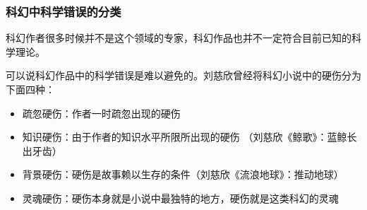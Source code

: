 \begin{frame}
  \frametitle{科幻中科学错误的分类}
  科幻作者很多时候并不是这个领域的专家，科幻作品也并不一定符合目前已知的科学理论。
  
  \pause
  
  可以说科幻作品中的科学错误是难以避免的。刘慈欣曾经将科幻小说中的硬伤分为下面四种：
  \begin{itemize}
    \item \alert{疏忽硬伤}：作者一时疏忽出现的硬伤
    \item \alert{知识硬伤}：由于作者的知识水平所限所出现的硬伤 （刘慈欣《鲸歌》：蓝鲸长出牙齿）
    \item \alert{背景硬伤}：硬伤是故事赖以生存的条件（刘慈欣《流浪地球》：推动地球）
    \item \alert{灵魂硬伤}：硬伤本身就是小说中最独特的地方，硬伤就是这类科幻的灵魂
  \end{itemize}

\end{frame}

